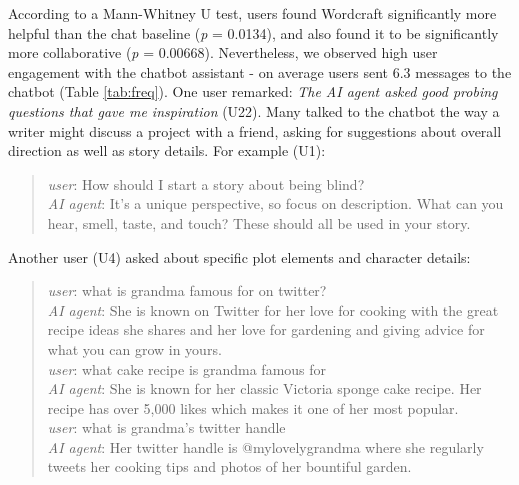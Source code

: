 According to a Mann-Whitney U test, users found Wordcraft significantly more helpful than the chat baseline (\textit{p} = 0.0134), and also found it to be significantly more collaborative (\textit{p} = 0.00668).  
Nevertheless, we observed high user engagement with the chatbot assistant - on average users sent 6.3  messages to the chatbot (Table \ref{tab:freq}). One user remarked: \textit{The AI agent asked good probing questions that gave me inspiration} (U22). Many talked to the chatbot the way a writer might discuss a project with a friend, asking for suggestions about overall direction as well as story details. For example (U1):





\begin{quote}
    {\color{blue}\textit{user}:} How should I start a story about being blind?\\
    {\color{blue}\textit{AI agent}:} It's a unique perspective, so focus on description. What can you hear, smell, taste, and touch? These should all be used in your story.
\end{quote}

\noindent Another user (U4) asked about specific plot elements and character details:

\begin{quote}
    {\color{blue}\textit{user}:} what is grandma famous for on twitter?\\
    {\color{blue}\textit{AI agent}:} She is known on Twitter for her love for cooking with the great recipe ideas she shares and her love for gardening and giving advice for what you can grow in yours.\\
    {\color{blue}\textit{user}:} what cake recipe is grandma famous for\\
    {\color{blue}\textit{AI agent}:} She is known for her classic Victoria sponge cake recipe. Her recipe has over 5,000 likes which makes it one of her most popular.\\
    {\color{blue}\textit{user}:} what is grandma's twitter handle\\
    {\color{blue}\textit{AI agent}:} Her twitter handle is @mylovelygrandma where she regularly tweets her cooking tips and photos of her bountiful garden.
\end{quote}

